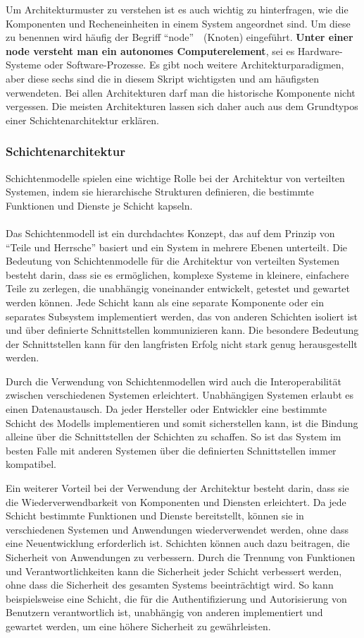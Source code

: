 \documentclass[../vs-script-first-v01.tex]{subfiles}
\begin{document}
Um Architekturmuster zu verstehen ist es auch wichtig zu hinterfragen, wie die Komponenten und Recheneinheiten in einem System angeordnet sind. Um diese zu benennen wird häufig der Begriff \enquote{node}~\cite{tanenbaum2017distributed}~(Knoten) eingeführt. \textbf{Unter einer node versteht man ein autonomes Computerelement}, sei es Hardware-Systeme oder Software-Prozesse. 
Es gibt noch weitere Architekturparadigmen, aber diese sechs sind die in diesem Skript wichtigsten und am häufigsten verwendeten. Bei allen Architekturen darf man die historische Komponente nicht vergessen. Die meisten Architekturen lassen sich daher auch aus dem Grundtypos einer Schichtenarchitektur erklären. 

\subsubsection{Schichtenarchitektur}

Schichtenmodelle spielen eine wichtige Rolle bei der Architektur von verteilten Systemen, indem sie hierarchische Strukturen definieren, die bestimmte Funktionen und Dienste je Schicht kapseln.
\\\\
Das Schichtenmodell ist ein durchdachtes Konzept, das auf dem Prinzip von \enquote{Teile und Herrsche} basiert und ein System in mehrere Ebenen unterteilt. Die Bedeutung von Schichtenmodelle für die Architektur von verteilten Systemen besteht darin, dass sie es ermöglichen, komplexe Systeme in kleinere, einfachere Teile zu zerlegen, die unabhängig voneinander entwickelt, getestet und gewartet werden können. Jede Schicht kann als eine separate Komponente oder ein separates Subsystem implementiert werden, das von anderen Schichten isoliert ist und über definierte Schnittstellen kommunizieren kann. Die besondere Bedeutung der Schnittstellen kann für den langfristen Erfolg nicht stark genug herausgestellt werden.

Durch die Verwendung von Schichtenmodellen wird auch die Interoperabilität zwischen verschiedenen Systemen erleichtert. Unabhängigen Systemen erlaubt es einen Datenaustausch. Da jeder Hersteller oder Entwickler eine bestimmte Schicht des Modells implementieren und somit sicherstellen kann, ist die Bindung alleine über die Schnittstellen der Schichten zu schaffen. So ist das System im besten Falle mit anderen Systemen über die definierten Schnittstellen immer kompatibel.

Ein weiterer Vorteil bei der Verwendung der Architektur besteht darin, dass sie die Wiederverwendbarkeit von Komponenten und Diensten erleichtert. Da jede Schicht bestimmte Funktionen und Dienste bereitstellt, können sie in verschiedenen Systemen und Anwendungen wiederverwendet werden, ohne dass eine Neuentwicklung erforderlich ist. Schichten können auch dazu beitragen, die Sicherheit von Anwendungen zu verbessern. Durch die Trennung von Funktionen und Verantwortlichkeiten kann die Sicherheit jeder Schicht verbessert werden, ohne dass die Sicherheit des gesamten Systems beeinträchtigt wird. So kann beispielsweise eine Schicht, die für die Authentifizierung und Autorisierung von Benutzern verantwortlich ist, unabhängig von anderen implementiert und gewartet werden, um eine höhere Sicherheit zu gewährleisten.
\end{document}
